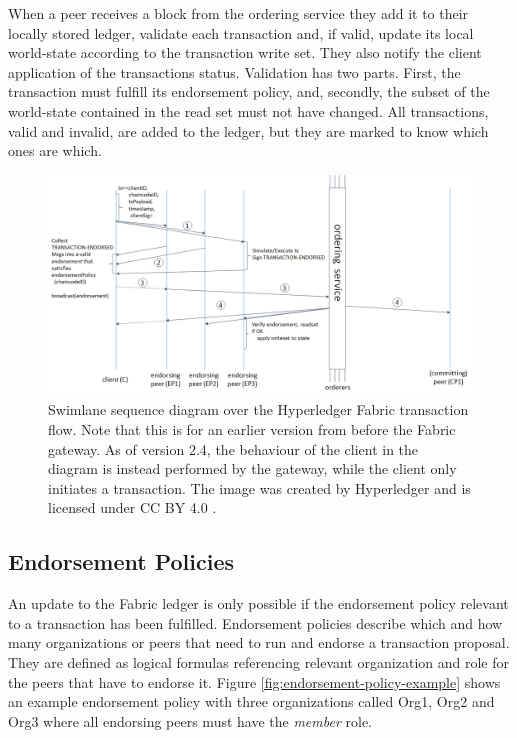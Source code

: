 \documentclass[english, biblatex, digitaloutput]{kththesis}
\begin{document}
When a peer receives a block from the ordering service they add it to their locally stored ledger, validate each transaction and, if valid, update its local world-state according to the transaction write set. They also notify the client application of the transactions status. Validation has two parts. First, the transaction must fulfill its endorsement policy, and, secondly, the subset of the world-state contained in the read set must not have changed. All transactions, valid and invalid, are added to the ledger, but they are marked to know which ones are which.

\begin{figure}
	\begin{center}
		\includegraphics[width=\textwidth]{figures/fabric_transaction_flow.png}
	\end{center}
	\caption[Swimlane sequence diagram over the Hyperledger Fabric transaction flow.]{Swimlane sequence diagram over the Hyperledger Fabric transaction flow. Note that this is for an earlier version from before the Fabric gateway. As of version 2.4, the behaviour of the client in the diagram is instead performed by the gateway, while the client only initiates a transaction. The image \cite{hyperledger_transaction-flow_nodate}  was created by Hyperledger and is licensed under CC BY 4.0 \cite{noauthor_creative_nodate}.}
	\label{fig:fabric-transaction-flow}
\end{figure}

\subsection{Endorsement Policies}

An update to the Fabric ledger is only possible if the endorsement policy relevant to a transaction has been fulfilled. Endorsement policies describe which and how many organizations or peers that need to run and endorse a transaction proposal. They are defined as logical formulas referencing relevant organization and role for the peers that have to endorse it. Figure \ref{fig:endorsement-policy-example} shows an example endorsement policy with three organizations called Org1, Org2 and Org3 where all endorsing peers must have the \textit{member} role.
\end{document}

